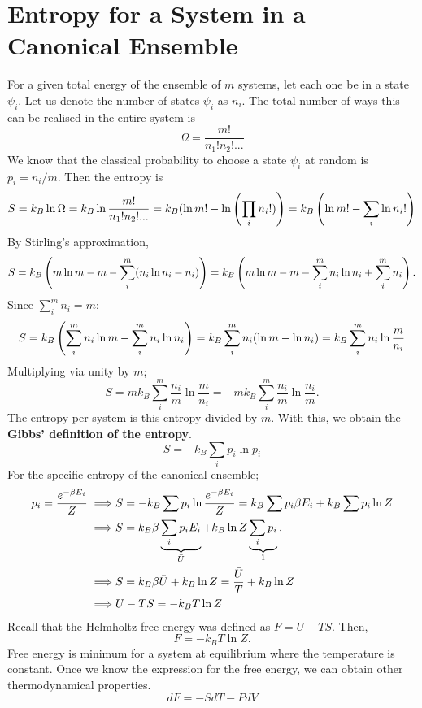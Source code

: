 \section{Entropy for a System in a \\ Canonical Ensemble}
    For a given total energy of the ensemble of $m$ systems, let each one be in a state $\psi_i$. Let us denote the number of states $\psi_i$ as $n_i$. The total number of ways this can be realised in the entire system is
    \begin{equation}
        \Omega=\frac{m!}{n_1!n_2!...}
    \end{equation}
    We know that the classical probability to choose a state $\psi_i$ at random is $p_i=n_i/m$. Then the entropy is
    \begin{align}
        S=k_B\ln\Omega=k_B\ln\frac{m!}{n_1!n_2!...}=k_B(\ln m!-\ln\left( \prod_in_i!) \right)= k_B\left( \ln m! -\sum_i\ln n_i! \right)
    \end{align}
    By Stirling's approximation,
    \begin{align}
        S=k_B\left( m\ln m-m-\sum_i^m(n_i\ln n_i-n_i) \right)=k_B\left( m\ln m-m-\sum_i^mn_i\ln n_i+\sum_i^mn_i \right).
    \end{align}
    Since $\sum_i^mn_i=m$;
    \begin{equation}
        S=k_B\left( \sum_i^mn_i\ln m-\sum_i^mn_i\ln n_i \right)=k_B\sum_i^mn_i(\ln m-\ln n_i)=k_B\sum_i^mn_i\ln\frac{m}{n_i}
    \end{equation}
    Multiplying via unity by $m$;
    \begin{equation}
        S=mk_B\sum_i^m\frac{n_i}{m}\ln\frac{m}{n_i}=-mk_B\sum_i^m\frac{n_i}{m}\ln\frac{n_i}{m}.
    \end{equation}
    The entropy per system is this entropy divided by $m$. With this, we obtain the \textbf{Gibbs' definition of the entropy}.
    \begin{equation}
        S=-k_B\sum_ip_i\ln p_i
    \end{equation}
    For the specific entropy of the canonical ensemble;
    \begin{align}
        p_i=\frac{e^{-\beta E_i}}{Z}\implies & S=-k_B\sum p_i\ln\frac{e^{-\beta E_i}}{Z}=k_B\sum p_i\beta E_i +k_B\sum p_i\ln Z \notag\\
        \implies & S = k_B\beta\underbrace{\sum_ip_iE_i}_{\Bar{U}}+k_B\ln Z\underbrace{\sum_ip_i}_1.\notag\\
        \implies & S=k_B\beta\Bar{U}+k_B\ln Z = \frac{\bar{U}}{T}+k_B\ln Z\notag\\
        \implies &U-TS=-k_BT\ln Z
    \end{align}
    Recall that the Helmholtz free energy was defined as $F=U-TS$. Then,
    \begin{equation}
        F = -k_BT\ln Z.
    \end{equation}
    Free energy is minimum for a system at equilibrium where the temperature is constant. Once we know the expression for the free energy, we can obtain other thermodynamical properties.
    \begin{equation}
        dF = -SdT -PdV
    \end{equation}
